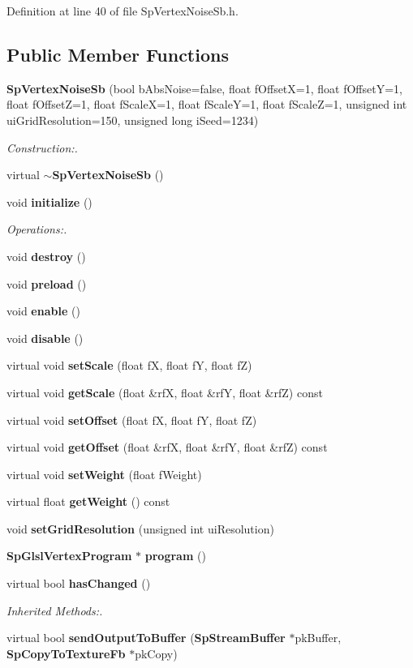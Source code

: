 Definition at line 40 of file Sp\-Vertex\-Noise\-Sb.h.\subsection*{Public Member Functions}
\begin{CompactItemize}
\item 
{\bf Sp\-Vertex\-Noise\-Sb} (bool b\-Abs\-Noise=false, float f\-Offset\-X=1, float f\-Offset\-Y=1, float f\-Offset\-Z=1, float f\-Scale\-X=1, float f\-Scale\-Y=1, float f\-Scale\-Z=1, unsigned int ui\-Grid\-Resolution=150, unsigned long i\-Seed=1234)
\begin{CompactList}\small\item\em Construction:. \item\end{CompactList}\item 
virtual {\bf $\sim$Sp\-Vertex\-Noise\-Sb} ()
\item 
void {\bf initialize} ()
\begin{CompactList}\small\item\em Operations:. \item\end{CompactList}\item 
void {\bf destroy} ()
\item 
void {\bf preload} ()
\item 
void {\bf enable} ()
\item 
void {\bf disable} ()
\item 
virtual void {\bf set\-Scale} (float f\-X, float f\-Y, float f\-Z)
\item 
virtual void {\bf get\-Scale} (float \&rf\-X, float \&rf\-Y, float \&rf\-Z) const
\item 
virtual void {\bf set\-Offset} (float f\-X, float f\-Y, float f\-Z)
\item 
virtual void {\bf get\-Offset} (float \&rf\-X, float \&rf\-Y, float \&rf\-Z) const
\item 
virtual void {\bf set\-Weight} (float f\-Weight)
\item 
virtual float {\bf get\-Weight} () const
\item 
void {\bf set\-Grid\-Resolution} (unsigned int ui\-Resolution)
\item 
{\bf Sp\-Glsl\-Vertex\-Program} $\ast$ {\bf program} ()
\item 
virtual bool {\bf has\-Changed} ()
\begin{CompactList}\small\item\em Inherited Methods:. \item\end{CompactList}\item 
virtual bool {\bf send\-Output\-To\-Buffer} ({\bf Sp\-Stream\-Buffer} $\ast$pk\-Buffer, {\bf Sp\-Copy\-To\-Texture\-Fb} $\ast$pk\-Copy)
\end{CompactItemize}
